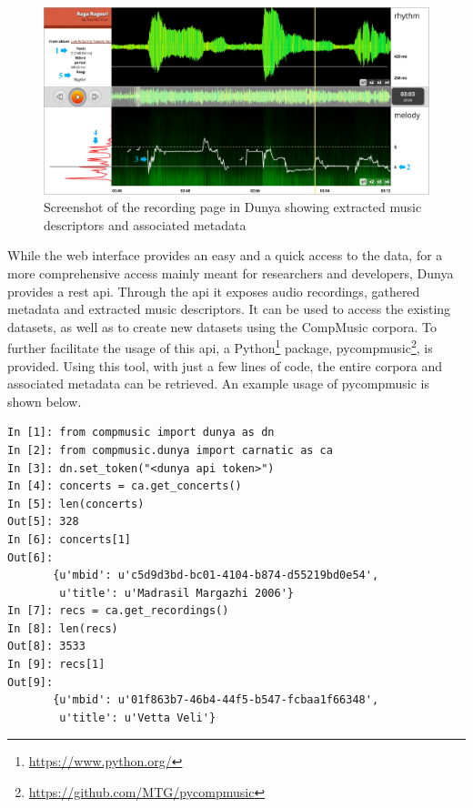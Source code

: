 \begin{figure}
	\begin{center}
		\includegraphics[width=\figSizeHundred]{ch08_applications/figures/dunyaScreenshot.pdf}
		\end{center}
		\caption[Screenshot of the recording page in Dunya]{Screenshot of the recording page in Dunya showing extracted music descriptors and associated metadata}
		\label{fig:dunya_recording}
\end{figure}

While the web interface provides an easy and a quick access to the data, for a more comprehensive access mainly meant for researchers and developers, Dunya provides a \acrshort{rest} \acrshort{api}. Through the \acrshort{api} it exposes audio recordings, gathered metadata and extracted music descriptors. It can be used to access the existing datasets, as well as to create new datasets using the CompMusic corpora. To further facilitate the usage of this \acrshort{api}, a Python\footnote{\url{https://www.python.org/}} package, \gls{pycompmusic}\footnote{\url{https://github.com/MTG/pycompmusic}}, is provided. Using this tool, with just a few lines of code, the entire corpora and associated metadata can be retrieved. An example usage of \gls{pycompmusic} is shown below.

%
%
%
%
%
{
	\small
\begin{verbatim}
In [1]: from compmusic import dunya as dn
In [2]: from compmusic.dunya import carnatic as ca
In [3]: dn.set_token("<dunya api token>")
In [4]: concerts = ca.get_concerts()
In [5]: len(concerts)
Out[5]: 328
In [6]: concerts[1]
Out[6]: 
       {u'mbid': u'c5d9d3bd-bc01-4104-b874-d55219bd0e54',
        u'title': u'Madrasil Margazhi 2006'}
In [7]: recs = ca.get_recordings()
In [8]: len(recs)
Out[8]: 3533
In [9]: recs[1]
Out[9]: 
       {u'mbid': u'01f863b7-46b4-44f5-b547-fcbaa1f66348',
        u'title': u'Vetta Veli'}        
\end{verbatim}
}

